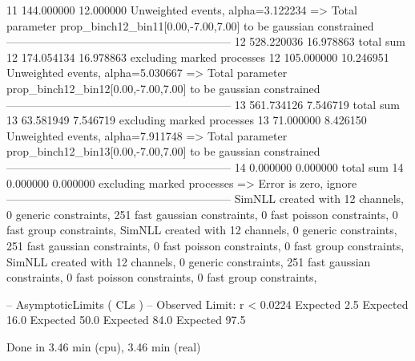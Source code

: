11         144.000000      12.000000       Unweighted events, alpha=3.122234
  => Total parameter prop_binch12_bin11[0.00,-7.00,7.00] to be gaussian constrained
------------------------------------------------------------
12         528.220036      16.978863       total sum                     
12         174.054134      16.978863       excluding marked processes    
12         105.000000      10.246951       Unweighted events, alpha=5.030667
  => Total parameter prop_binch12_bin12[0.00,-7.00,7.00] to be gaussian constrained
------------------------------------------------------------
13         561.734126      7.546719        total sum                     
13         63.581949       7.546719        excluding marked processes    
13         71.000000       8.426150        Unweighted events, alpha=7.911748
  => Total parameter prop_binch12_bin13[0.00,-7.00,7.00] to be gaussian constrained
------------------------------------------------------------
14         0.000000        0.000000        total sum                     
14         0.000000        0.000000        excluding marked processes    
  => Error is zero, ignore      
------------------------------------------------------------
SimNLL created with 12 channels, 0 generic constraints, 251 fast gaussian constraints, 0 fast poisson constraints, 0 fast group constraints, 
SimNLL created with 12 channels, 0 generic constraints, 251 fast gaussian constraints, 0 fast poisson constraints, 0 fast group constraints, 
SimNLL created with 12 channels, 0 generic constraints, 251 fast gaussian constraints, 0 fast poisson constraints, 0 fast group constraints, 

 -- AsymptoticLimits ( CLs ) --
Observed Limit: r < 0.0224
Expected  2.5%
Expected 16.0%
Expected 50.0%
Expected 84.0%
Expected 97.5%

Done in 3.46 min (cpu), 3.46 min (real)
